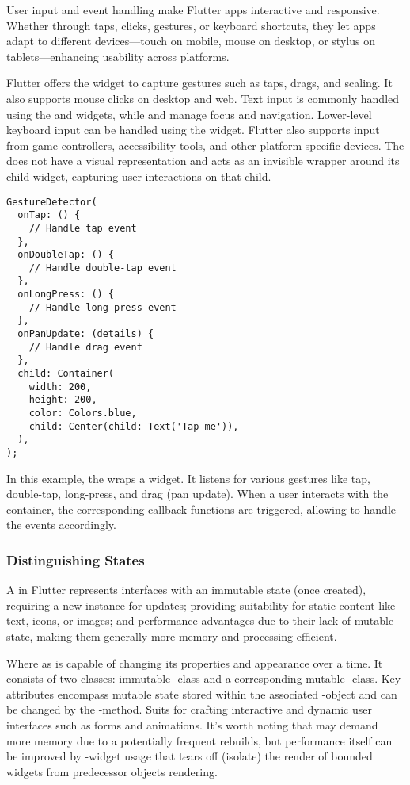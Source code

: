 User input and event handling make Flutter apps interactive and responsive. Whether through taps, clicks, gestures, or 
keyboard shortcuts, they let apps adapt to different devices—touch on mobile, mouse on desktop, or stylus on 
tablets—enhancing usability across platforms.

Flutter offers the  widget to capture gestures such as taps, drags, and scaling. It also supports 
mouse clicks on desktop and web. Text input is commonly handled using the  and  widgets, 
while  and  manage focus and navigation. Lower-level keyboard input can be handled using the 
 widget. Flutter also supports input from game controllers, accessibility tools, and other 
platform-specific devices. The  does not have a visual representation and acts as an invisible 
wrapper around its child widget, capturing user interactions on that child.

\begin{lstlisting}
GestureDetector(
  onTap: () {
    // Handle tap event
  },
  onDoubleTap: () {
    // Handle double-tap event
  },
  onLongPress: () {
    // Handle long-press event
  },
  onPanUpdate: (details) {
    // Handle drag event
  },
  child: Container(
    width: 200,
    height: 200,
    color: Colors.blue,
    child: Center(child: Text('Tap me')),
  ),
);
\end{lstlisting}

\noindent In this example, the  wraps a  widget. It listens for various gestures like
tap, double-tap, long-press, and drag (pan update). When a user interacts with the container, the corresponding callback 
functions are triggered, allowing to handle the events accordingly.

\newpage
\subsubsection{Distinguishing States} \label{flutter-state}

A  in Flutter represents interfaces with an immutable state (once created), requiring a new instance 
for updates; providing suitability for static content like text, icons, or images; and performance advantages due to 
their lack of mutable state, making them generally more memory and processing-efficient.

Where as  is capable of changing its properties and appearance over a time. It consists of two classes: 
immutable -class and a corresponding mutable -class. Key attributes encompass mutable state stored 
within the associated -object and can be changed by the -method. Suits for crafting interactive 
and dynamic user interfaces such as forms and animations. It's worth noting that  may demand more 
memory due to a potentially frequent rebuilds, but performance itself can be improved by -widget 
usage that tears off (isolate) the render of bounded widgets from predecessor objects rendering.

